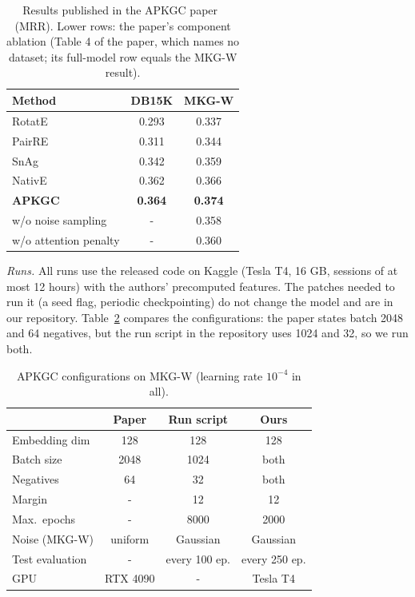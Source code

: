 \documentclass[conference,a4paper]{IEEEtran}
\begin{document}
\begin{table}[!t]
\centering
\caption{Results published in the APKGC paper~\cite{apkgc} (MRR). Lower rows: the paper's component ablation (Table 4 of the paper, which names no dataset; its full-model row equals the MKG-W result).}
\label{tab:paper}
\small
\begin{tabular}{lcc}
\toprule
Method & DB15K & MKG-W\\
\midrule
RotatE~\cite{rotate} & 0.293 & 0.337\\
PairRE~\cite{pairre} & 0.311 & 0.344\\
SnAg~\cite{snag} & 0.342 & 0.359\\
NativE~\cite{native} & 0.362 & 0.366\\
\textbf{APKGC} & \textbf{0.364} & \textbf{0.374}\\
\midrule
\quad w/o noise sampling & - & 0.358\\
\quad w/o attention penalty & - & 0.360\\
\bottomrule
\end{tabular}
\end{table}

\emph{Runs.} All runs use the released code on Kaggle (Tesla T4, 16 GB, sessions of at
most 12 hours) with the authors' precomputed features. The patches needed to run it (a
seed flag, periodic checkpointing) do not change the model and are in our repository.
Table~\ref{tab:cfg} compares the configurations: the paper states batch 2048 and 64
negatives, but the run script in the repository uses 1024 and 32, so we run both.

\begin{table}[!t]
\centering
\caption{APKGC configurations on MKG-W (learning rate $10^{-4}$ in all).}
\label{tab:cfg}
\small
\setlength{\tabcolsep}{3pt}
\begin{tabular}{lccc}
\toprule
 & Paper & Run script & Ours\\
\midrule
Embedding dim & 128 & 128 & 128\\
Batch size & 2048 & 1024 & both\\
Negatives & 64 & 32 & both\\
Margin & - & 12 & 12\\
Max.\ epochs & - & 8000 & 2000\\
Noise (MKG-W) & uniform & Gaussian & Gaussian\\
Test evaluation & - & every 100 ep. & every 250 ep.\\
GPU & RTX 4090 & - & Tesla T4\\
\bottomrule
\end{tabular}
\end{table}
\end{document}
